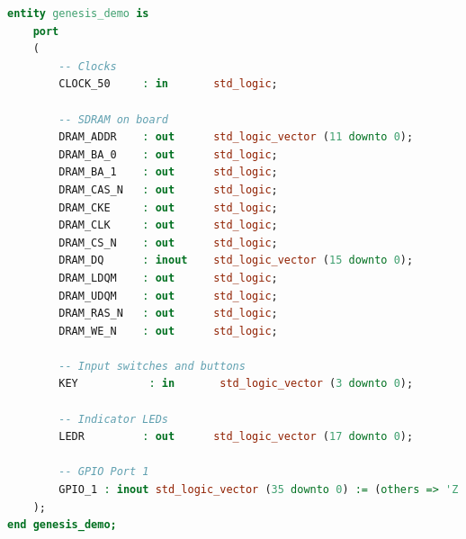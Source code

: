 \documentclass{capstonedoc}
\begin{document}
\noindent\begin{minipage}{\textwidth}
\begin{lstlisting}[language={vhdl},caption={Entity for Top-Level},label={lst:tl_port}]
entity genesis_demo is
	port
	(
		-- Clocks
		CLOCK_50     : in       std_logic;

		-- SDRAM on board
		DRAM_ADDR    : out      std_logic_vector (11 downto 0);
		DRAM_BA_0    : out      std_logic;
		DRAM_BA_1    : out      std_logic;
		DRAM_CAS_N   : out      std_logic;
		DRAM_CKE     : out      std_logic;
		DRAM_CLK     : out      std_logic;
		DRAM_CS_N    : out      std_logic;
		DRAM_DQ      : inout    std_logic_vector (15 downto 0);
		DRAM_LDQM    : out      std_logic;
		DRAM_UDQM    : out      std_logic;
		DRAM_RAS_N   : out      std_logic;
		DRAM_WE_N    : out      std_logic;

		-- Input switches and buttons
		KEY           : in       std_logic_vector (3 downto 0);

		-- Indicator LEDs
		LEDR         : out      std_logic_vector (17 downto 0);

		-- GPIO Port 1
		GPIO_1 : inout std_logic_vector (35 downto 0) := (others => 'Z')
	);
end genesis_demo;
\end{lstlisting}
\end{minipage}
\end{document}
